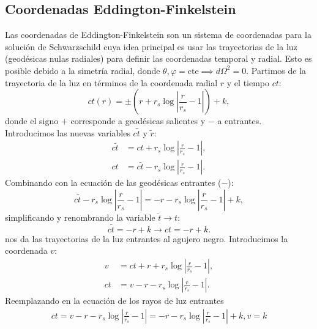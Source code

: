 \subsection{Coordenadas Eddington-Finkelstein}
Las coordenadas de Eddington-Finkelstein son un sistema de coordenadas para la solución de Schwarzschild cuya idea principal es usar las trayectorias de la luz (geodésicas nulas radiales) para definir las coordenadas temporal y radial. Esto es posible debido a la simetría radial, donde \( \theta, \varphi = \text{cte} \implies d\Omega^2 = 0 \).
Partimos de la trayectoria de la luz en términos de la coordenada radial \( r \) y el tiempo \( ct \):
\begin{equation}
    ct(r) = \pm \left( r + r_s \log \left| \frac{r}{r_s} - 1 \right| \right) + k,
\end{equation}
donde el signo \( + \) corresponde a geodésicas salientes y \( - \) a entrantes. Introducimos las nuevas variables \( c\tilde{t} \) y \( \tilde{r} \):
\begin{equation}
    \begin{aligned}
        c\tilde{t} & = ct + r_s \log \left| \frac{r}{r_s} - 1 \right|,         \\
        ct         & = c\tilde{t} - r_s \log \left| \frac{r}{r_s} - 1 \right|.
    \end{aligned}
\end{equation}
Combinando con la ecuación de las geodésicas entrantes (\( - \)):
\begin{equation}
    c\tilde{t} - r_s \log \left| \frac{r}{r_s} - 1 \right| = -r - r_s \log \left| \frac{r}{r_s} - 1 \right| + k,
\end{equation}
simplificando y renombrando la variable $\tilde{t} \to t$:
\begin{equation}
    c\tilde{t} = -r + k \to ct= -r + k .
\end{equation}
nos da las trayectorias de la luz entrantes al agujero negro.
Introducimos la coordenada \( v \):
\begin{equation}
    \begin{aligned}
        v  & = ct + r + r_s \log \left| \frac{r}{r_s} - 1 \right|, \\
        ct & = v - r - r_s \log \left| \frac{r}{r_s} - 1 \right|.
    \end{aligned}
\end{equation}
Reemplazando en la ecuación de los rayos de luz entrantes
\begin{equation}
    \begin{aligned}
        ct =v - r - r_s \log \left| \frac{r}{r_s} - 1 \right|  = - r - r_s \log \left| \frac{r}{r_s} - 1 \right| + k,
        v = k
    \end{aligned}
\end{equation}
